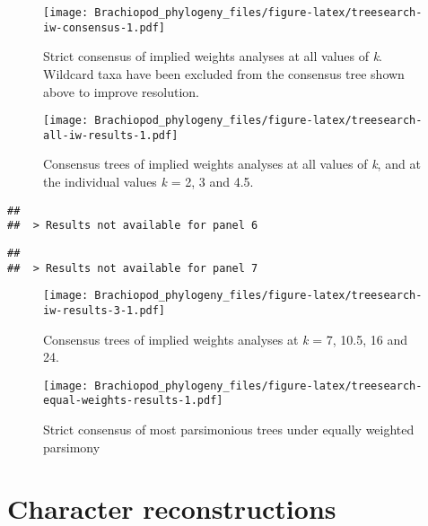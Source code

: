 \documentclass[openany]{book}
\theoremstyle{definition}
\theoremstyle{definition}
\theoremstyle{definition}
\theoremstyle{remark}
\begin{document}
\begin{figure}
\centering
\texttt{[image: Brachiopod\_phylogeny\_files/figure-latex/treesearch-iw-consensus-1.pdf]}
\caption{\label{fig:treesearch-iw-consensus}Strict consensus of implied weights analyses at all
values of \emph{k}. Wildcard taxa have been excluded from the consensus
tree shown above to improve resolution.}
\end{figure}








\clearpage 

\begin{figure}
\centering
\texttt{[image: Brachiopod\_phylogeny\_files/figure-latex/treesearch-all-iw-results-1.pdf]}
\caption{\label{fig:treesearch-all-iw-results}Consensus trees of implied weights analyses
at all values of \emph{k}, and at the individual
values \emph{k} = 2, 3 and 4.5.}
\end{figure}

\clearpage 

\begin{verbatim}
## 
##  > Results not available for panel 6
\end{verbatim}

\begin{verbatim}
## 
##  > Results not available for panel 7
\end{verbatim}

\begin{figure}
\centering
\texttt{[image: Brachiopod\_phylogeny\_files/figure-latex/treesearch-iw-results-3-1.pdf]}
\caption{\label{fig:treesearch-iw-results-3}Consensus trees of implied weights analyses
at \emph{k} = 7, 10.5, 16 and 24.}
\end{figure}

\clearpage

\begin{figure}
\centering
\texttt{[image: Brachiopod\_phylogeny\_files/figure-latex/treesearch-equal-weights-results-1.pdf]}
\caption{\label{fig:treesearch-equal-weights-results}Strict consensus of
most parsimonious trees under equally weighted parsimony}
\end{figure}

\clearpage

\hypertarget{reconstructions}{\chapter{Character
reconstructions}\label{reconstructions}}
\end{document}
